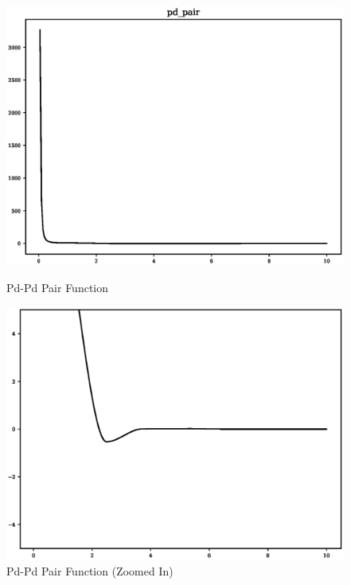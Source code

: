\begin{figure}[ht] 
  \begin{minipage}[b]{0.4\linewidth}
    \centering
    \includegraphics[width=.9\linewidth]{chapters/results_potential_fitting/pot_fepd_fcc_2/pd_pair.eps} 
    \caption{Pd-Pd Pair Function}  
  \end{minipage}%
  \begin{minipage}[b]{0.4\linewidth}
    \centering
    \includegraphics[width=.9\linewidth]{chapters/results_potential_fitting/pot_fepd_fcc_2/pd_pair_zoom.eps} 
    \caption{Pd-Pd Pair Function (Zoomed In)} 
  \end{minipage} 
  \begin{minipage}[b]{0.4\linewidth}
    \centering

\end{minipage}
\end{figure}
